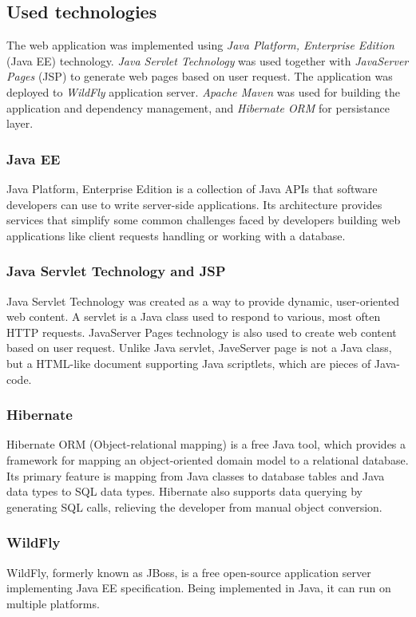 \documentclass[thesis=B,english]{FITthesis}[2012/06/26]
\begin{document}
	\subsection{Used technologies}
	The web application was implemented using \emph{Java Platform, Enterprise Edition} (Java EE) technology. \emph{Java Servlet Technology} was used together with \emph{JavaServer Pages} (JSP) to generate web pages based on user request. The application was deployed to \emph{WildFly} application server. \emph{Apache Maven} was used for building the application and dependency management, and \emph{Hibernate ORM} for persistance layer.
	\subsubsection{Java EE}
	Java Platform, Enterprise Edition is a collection of Java APIs that software developers can use to write server-side applications. Its architecture provides services that simplify some common challenges faced by developers building web applications like client requests handling or working with a database.
	\subsubsection{Java Servlet Technology and JSP}
	Java Servlet Technology was created as a way to provide dynamic, user-oriented web content. A servlet is a Java class used to respond to various, most often HTTP requests. JavaServer Pages technology is also used to create web content based on user request. Unlike Java servlet, JaveServer page is not a Java class, but a HTML-like document supporting Java scriptlets, which are pieces of Java-code.
	\subsubsection{Hibernate}
	Hibernate ORM (Object-relational mapping) is a free Java tool, which provides a framework for mapping an object-oriented domain model to a relational database. Its primary feature is mapping from Java classes to database tables and Java data types to SQL data types. Hibernate also supports data querying by generating SQL calls, relieving the developer from manual object conversion.
	\subsubsection{WildFly}
	WildFly, formerly known as JBoss, is a free open-source application server implementing Java EE specification. Being implemented in Java, it can run on multiple platforms.
\end{document}
